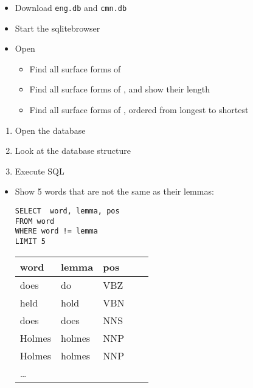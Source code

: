 \documentclass[a4paper,landscape,headrule,footrule,xetex]{foils}
\begin{document}
\begin{itemize}
\item Download \texttt{eng.db} and \texttt{cmn.db}
\item Start the sqlitebrowser
\item Open 
  \begin{itemize}
  \item Find all surface forms of 
  \item Find all surface forms of , and show their length
  \item Find all surface forms of , ordered from longest to shortest
  \end{itemize}
\end{itemize}

\begin{enumerate}
\item Open the database
\item Look at the database structure
\item Execute SQL
\end{enumerate}


\begin{itemize}
\item Show 5 words that are not the same as their lemmas:
\begin{verbatim}
SELECT  word, lemma, pos
FROM word
WHERE word != lemma
LIMIT 5
\end{verbatim}
  \begin{tabular}{lllll}
    \textbf{word}  & \textbf{lemma}  &  \textbf{pos} \\ \hline
    does  & do &  VBZ \\
    held  & hold &  VBN \\
    does & does &  NNS \\
    Holmes & holmes & NNP \\
    Holmes & holmes & NNP \\
    \ldots
  \end{tabular}
\end{itemize}

\end{document}
